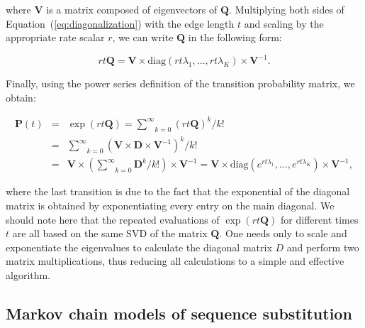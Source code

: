 \noindent where $\mathbf{V}$ is a matrix composed of eigenvectors of $\mathbf{Q}$. 
Multiplying both sides of Equation~(\ref{eq:diagonalization}) with the edge length $t$ and scaling by the appropriate rate scalar $r$, we can write $\mathbf{Q}$ in the following form:

\begin{equation}
rt\mathbf{Q}=\mathbf{V}\times\text{diag}(rt\lambda_{1},\ldots,rt\lambda_{K})\times\mathbf{V}^{-1} .
\end{equation}

\noindent Finally, using the power series definition of the transition probability matrix, we obtain: 

\begin{eqnarray}
\mathbf{P}(t) &=& \exp\left(rt\mathbf{Q}\right)  =  \underset{k=0}{\overset{\infty}{\sum}}\left(rt\mathbf{Q}\right)^{k}/k! \\ \nonumber
 &=&  \underset{k=0}{\overset{\infty}{\sum}}\left(\mathbf{V}\times\mathbf{D}\times\mathbf{V}^{-1}\right)^{k}/k! \\ \nonumber
 &=& \mathbf{V}\times\left(\underset{k=0}{\overset{\infty}{\sum}}\mathbf{D}^{k}/k!\right)\times\mathbf{V}^{-1} = \mathbf{V}\times\text{diag}(e^{rt\lambda_{1}},\ldots,e^{rt\lambda_{K}})\times\mathbf{V}^{-1} ,
\label{eq:eigen_decomposition}
\end{eqnarray}

\noindent 
where the last transition is due to the fact that the exponential of the diagonal matrix is obtained by exponentiating every entry on the main diagonal.
We should note here that the repeated evaluations of $\exp\left(rt\mathbf{Q}\right)$ for different times $t$ are all based on the same SVD of the matrix $\mathbf{Q}$. 
One needs only to scale and exponentiate the eigenvalues to calculate the diagonal matrix $D$ and perform two matrix multiplications, thus reducing all calculations to a simple and effective algorithm. 

\subsection{Markov chain models of sequence substitution\label{sub:subst_models}}

